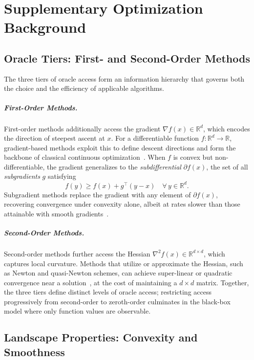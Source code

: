 \chapter{Supplementary Optimization Background}

\section{Oracle Tiers: First- and Second-Order Methods}
\label{app:oracle-tiers}

The three tiers of oracle access form an information hierarchy that
governs both the choice and the efficiency of applicable algorithms.

\paragraph{First-Order Methods.}
First-order methods additionally access the gradient
$\nabla f(x) \in \mathbb{R}^d$, which encodes the direction of
steepest ascent at $x$. For a differentiable function
$f : \mathbb{R}^d \to \mathbb{R}$, gradient-based methods exploit
this to define descent directions and form the backbone of classical
continuous optimization~\cite{nocedal2006numerical}. When $f$ is
convex but non-differentiable, the gradient generalizes to the
\textit{subdifferential} $\partial f(x)$, the set of all
\textit{subgradients} $g$ satisfying
\[
  f(y) \geq f(x) + g^\top(y - x) \quad \forall\, y \in \mathbb{R}^d.
\]
Subgradient methods replace the gradient with any element of
$\partial f(x)$, recovering convergence under convexity alone, albeit
at rates slower than those attainable with smooth
gradients~\cite{bertsekas2009convex}.

\paragraph{Second-Order Methods.}
Second-order methods further access the Hessian
$\nabla^2 f(x) \in \mathbb{R}^{d \times d}$, which captures local
curvature. Methods that utilize or approximate the Hessian, such as
Newton and quasi-Newton schemes, can achieve super-linear or quadratic
convergence near a solution~\cite{nocedal2006numerical}, at the cost
of maintaining a $d \times d$ matrix. Together, the three tiers
define distinct levels of oracle access; restricting access
progressively from second-order to zeroth-order culminates in the
black-box model where only function values are observable.

\section{Landscape Properties: Convexity and Smoothness}
\label{app:landscape-props}

